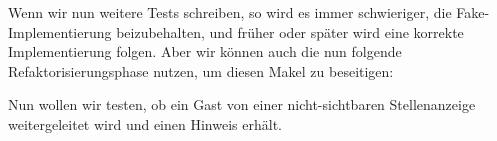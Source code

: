 Wenn wir nun weitere Tests schreiben, so wird es immer schwieriger, die Fake-Implementierung beizubehalten, und früher oder später wird eine korrekte Implementierung folgen. 
Aber wir können auch die nun folgende Refaktorisierungsphase nutzen, um diesen Makel zu beseitigen:
\tddrefactor
%                                                                                                                                                                    
\begin{ruby}[label=app/controllers/jobs\_controller.rb]
 
    \PY{o}{[}\PY{o}{]}
\end{ruby}


Nun wollen wir testen, ob ein Gast von einer nicht-sichtbaren Stellenanzeige weitergeleitet wird und einen Hinweis erhält.


